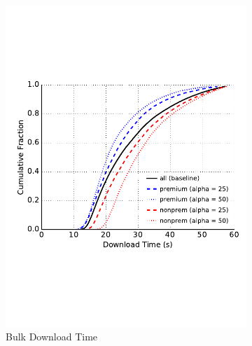 \begin{figure}
\begin{subfigure}[t]{0.32\textwidth}
\includegraphics[trim={0 3cm 0 3cm}, clip, width=1.0\textwidth]{images/modifier_pr25_bulk.pdf}
		\caption{Bulk Download Time}
\label{fig:modifier_pr25_bulk}
	\end{subfigure}
	\begin{subfigure}[t]{0.32\textwidth} \centering

\end{subfigure}
\end{figure}
